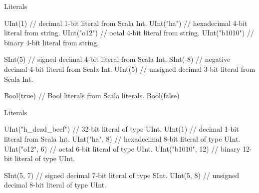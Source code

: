 \documentclass[xcolor=pdflatex,dvipsnames,table]{beamer}
\begin{document}
\begin{frame}[fragile]{Literals}
\begin{scala}
UInt(1)       // decimal 1-bit literal from Scala Int. 
UInt("ha")    // hexadecimal 4-bit literal from string.
UInt("o12")   // octal 4-bit literal from string. 
UInt("b1010") // binary 4-bit literal from string.

SInt(5)       // signed decimal 4-bit literal from Scala Int.
SInt(-8)      // negative decimal 4-bit literal from Scala Int.
UInt(5)       // unsigned decimal 3-bit literal from Scala Int.

Bool(true)    // Bool literals from Scala literals.
Bool(false)
\end{scala}
\end{frame}
 
\begin{frame}[fragile]{Literals}
\begin{scala}
UInt("h_dead_beef") // 32-bit literal of type UInt.
UInt(1)             // decimal 1-bit literal from Scala Int.
UInt("ha", 8)       // hexadecimal 8-bit literal of type UInt.
UInt("o12", 6)      // octal 6-bit literal of type UInt.
UInt("b1010", 12)   // binary 12-bit literal of type UInt.

SInt(5, 7)          // signed decimal 7-bit literal of type SInt.
UInt(5, 8)          // unsigned decimal 8-bit literal of type UInt.
\end{scala}
\end{frame}
\end{document}
